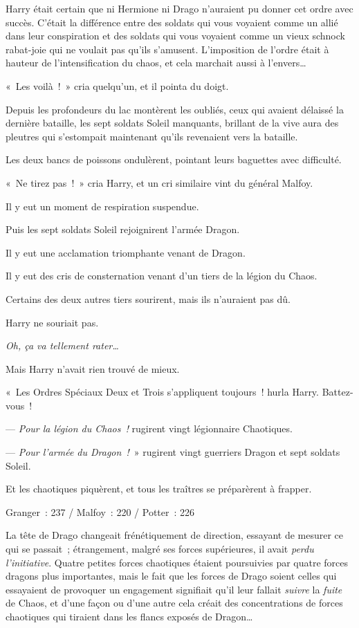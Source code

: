 Harry était certain que ni Hermione ni Drago n'auraient pu donner cet ordre avec succès.
C'était la différence entre des soldats qui vous voyaient comme un allié dans leur conspiration et des soldats qui vous voyaient comme un vieux schnock rabat-joie qui ne voulait pas qu'ils s'amusent.
L'imposition de l'ordre était à hauteur de l'intensification du chaos, et cela marchait aussi à l'envers…

«~Les voilà~!~»
cria quelqu'un, et il pointa du doigt.

Depuis les profondeurs du lac montèrent les oubliés, ceux qui avaient délaissé la dernière bataille, les sept soldats Soleil manquants, brillant de la vive aura des pleutres qui s'estompait maintenant qu'ils revenaient vers la bataille.

Les deux bancs de poissons ondulèrent, pointant leurs baguettes avec difficulté.

«~Ne tirez pas~!~»
cria Harry, et un cri similaire vint du général Malfoy.

Il y eut un moment de respiration suspendue.

Puis les sept soldats Soleil rejoignirent l'armée Dragon.

Il y eut une acclamation triomphante venant de Dragon.

Il y eut des cris de consternation venant d'un tiers de la légion du Chaos.

Certains des deux autres tiers sourirent, mais ils n'auraient pas dû.

Harry ne souriait pas.

\emph{Oh, ça va tellement rater…}

Mais Harry n'avait rien trouvé de mieux.

«~Les Ordres Spéciaux Deux et Trois s'appliquent toujours~! hurla Harry.
Battez-vous~!

--- \emph{Pour la légion du Chaos~!} rugirent vingt légionnaire Chaotiques.

--- \emph{Pour l'armée du Dragon~!}~» rugirent vingt guerriers Dragon et sept soldats Soleil.

Et les chaotiques piquèrent, et tous les traîtres se préparèrent à frapper.

Granger~: 237 / Malfoy~: 220 / Potter~: 226

\later

La tête de Drago changeait frénétiquement de direction, essayant de mesurer ce qui se passait~; étrangement, malgré ses forces supérieures, il avait \emph{perdu l'initiative}.
Quatre petites forces chaotiques étaient poursuivies par quatre forces dragons plus importantes, mais le fait que les forces de Drago soient celles qui essayaient de provoquer un engagement signifiait qu'il leur fallait \emph{suivre} la \emph{fuite} de Chaos, et d'une façon ou d'une autre cela créait des concentrations de forces chaotiques qui tiraient dans les flancs exposés de Dragon…

